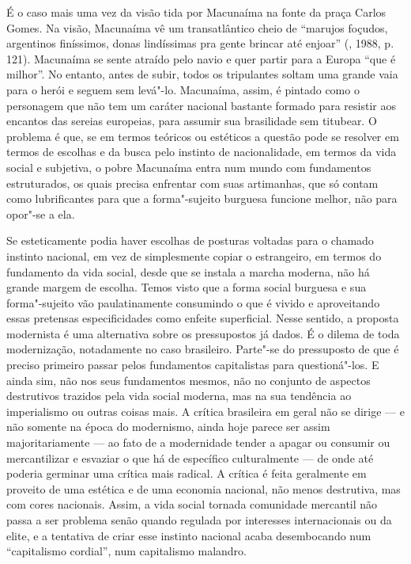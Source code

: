 É o caso mais uma vez da visão tida por Macunaíma na fonte da praça
Carlos Gomes. Na visão, Macunaíma vê um transatlântico cheio de
``marujos foçudos, argentinos finíssimos, donas lindíssimas pra gente
brincar até enjoar'' (, 1988, p. 121). Macunaíma se sente atraído
pelo navio e quer partir para a Europa ``que é milhor''. No entanto,
antes de subir, todos os tripulantes soltam uma grande vaia para o herói
e seguem sem levá"-lo. Macunaíma, assim, é pintado como o personagem que
não tem um caráter nacional bastante formado para resistir aos encantos
das sereias europeias, para assumir sua brasilidade sem titubear. O problema é que,
se em termos teóricos ou estéticos a questão pode se resolver em termos
de escolhas e da busca pelo instinto de nacionalidade, em termos da vida
social e subjetiva, o pobre Macunaíma entra num mundo com fundamentos estruturados,
os quais precisa enfrentar com suas artimanhas, que só contam como
lubrificantes para que a forma"-sujeito burguesa funcione melhor, não
para opor"-se a ela.

Se esteticamente podia haver escolhas de posturas voltadas para o
chamado instinto nacional, em vez de simplesmente copiar o estrangeiro,
em termos do fundamento da vida social, desde que se instala a marcha
moderna, não há grande margem de escolha. Temos visto que a forma social
burguesa e sua forma"-sujeito vão paulatinamente consumindo o que é
vivido e aproveitando essas pretensas especificidades como enfeite
superficial. Nesse sentido, a proposta modernista é uma alternativa
sobre os pressupostos já dados. É o dilema de toda modernização,
notadamente no caso brasileiro. Parte"-se do pressuposto
de que é preciso primeiro passar pelos
fundamentos capitalistas para questioná"-los. E ainda sim, não nos seus
fundamentos mesmos, não no conjunto de aspectos destrutivos trazidos
pela vida social moderna, mas na sua tendência ao imperialismo ou outras
coisas mais. A crítica brasileira em geral não se dirige --- e não
somente na época do modernismo, ainda hoje parece ser assim
majoritariamente --- ao fato de a modernidade tender a apagar ou consumir
ou mercantilizar e esvaziar o que há de específico culturalmente --- de
onde até poderia germinar uma crítica mais radical. A crítica é feita
geralmente em proveito de uma estética e de uma economia nacional, não
menos destrutiva, mas com cores nacionais. Assim, a vida social tornada
comunidade mercantil não passa a ser problema senão quando regulada por
interesses internacionais ou da elite, e a tentativa de criar esse
instinto nacional acaba desembocando num ``capitalismo cordial'', num
capitalismo malandro.

